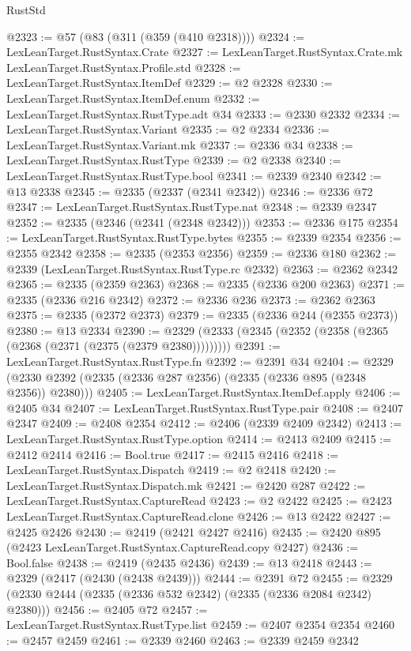 \begin{lexlean}{RustStd}
\begin{coremodule}
@2323 := @57 (@83 (@311 (@359 (@410 @2318))))
@2324 := LexLeanTarget.RustSyntax.Crate
@2327 := LexLeanTarget.RustSyntax.Crate.mk LexLeanTarget.RustSyntax.Profile.std
@2328 := LexLeanTarget.RustSyntax.ItemDef
@2329 := @2 @2328
@2330 := LexLeanTarget.RustSyntax.ItemDef.enum
@2332 := LexLeanTarget.RustSyntax.RustType.adt @34
@2333 := @2330 @2332
@2334 := LexLeanTarget.RustSyntax.Variant
@2335 := @2 @2334
@2336 := LexLeanTarget.RustSyntax.Variant.mk
@2337 := @2336 @34
@2338 := LexLeanTarget.RustSyntax.RustType
@2339 := @2 @2338
@2340 := LexLeanTarget.RustSyntax.RustType.bool
@2341 := @2339 @2340
@2342 := @13 @2338
@2345 := @2335 (@2337 (@2341 @2342))
@2346 := @2336 @72
@2347 := LexLeanTarget.RustSyntax.RustType.nat
@2348 := @2339 @2347
@2352 := @2335 (@2346 (@2341 (@2348 @2342)))
@2353 := @2336 @175
@2354 := LexLeanTarget.RustSyntax.RustType.bytes
@2355 := @2339 @2354
@2356 := @2355 @2342
@2358 := @2335 (@2353 @2356)
@2359 := @2336 @180
@2362 := @2339 (LexLeanTarget.RustSyntax.RustType.rc @2332)
@2363 := @2362 @2342
@2365 := @2335 (@2359 @2363)
@2368 := @2335 (@2336 @200 @2363)
@2371 := @2335 (@2336 @216 @2342)
@2372 := @2336 @236
@2373 := @2362 @2363
@2375 := @2335 (@2372 @2373)
@2379 := @2335 (@2336 @244 (@2355 @2373))
@2380 := @13 @2334
@2390 := @2329 (@2333 (@2345 (@2352 (@2358 (@2365 (@2368 (@2371 (@2375 (@2379 @2380)))))))))
@2391 := LexLeanTarget.RustSyntax.RustType.fn
@2392 := @2391 @34
@2404 := @2329 (@2330 @2392 (@2335 (@2336 @287 @2356) (@2335 (@2336 @895 (@2348 @2356)) @2380)))
@2405 := LexLeanTarget.RustSyntax.ItemDef.apply
@2406 := @2405 @34
@2407 := LexLeanTarget.RustSyntax.RustType.pair
@2408 := @2407 @2347
@2409 := @2408 @2354
@2412 := @2406 (@2339 @2409 @2342)
@2413 := LexLeanTarget.RustSyntax.RustType.option
@2414 := @2413 @2409
@2415 := @2412 @2414
@2416 := Bool.true
@2417 := @2415 @2416
@2418 := LexLeanTarget.RustSyntax.Dispatch
@2419 := @2 @2418
@2420 := LexLeanTarget.RustSyntax.Dispatch.mk
@2421 := @2420 @287
@2422 := LexLeanTarget.RustSyntax.CaptureRead
@2423 := @2 @2422
@2425 := @2423 LexLeanTarget.RustSyntax.CaptureRead.clone
@2426 := @13 @2422
@2427 := @2425 @2426
@2430 := @2419 (@2421 @2427 @2416)
@2435 := @2420 @895 (@2423 LexLeanTarget.RustSyntax.CaptureRead.copy @2427)
@2436 := Bool.false
@2438 := @2419 (@2435 @2436)
@2439 := @13 @2418
@2443 := @2329 (@2417 (@2430 (@2438 @2439)))
@2444 := @2391 @72
@2455 := @2329 (@2330 @2444 (@2335 (@2336 @532 @2342) (@2335 (@2336 @2084 @2342) @2380)))
@2456 := @2405 @72
@2457 := LexLeanTarget.RustSyntax.RustType.list
@2459 := @2407 @2354 @2354
@2460 := @2457 @2459
@2461 := @2339 @2460
@2463 := @2339 @2459 @2342

\end{coremodule}
\end{lexlean}
